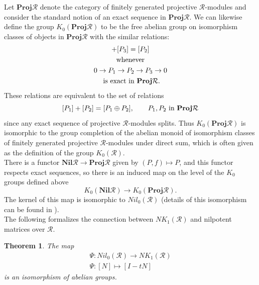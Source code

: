 \documentclass{amsart}
\newtheorem{thm}[equation]{Theorem}
\theoremstyle{definition}
\theoremstyle{definition}
\newcommand{\apr}{(Ap. \ref}
\newcommand{\calR}{\mathcal{R}}
\numberwithin{equation}{subsection}
\begin{document}
Let $\textbf{Proj}\calR$ denote the category of finitely generated projective $\calR$-modules and consider the standard notion of an exact sequence in $\textbf{Proj}\calR$. We can likewise define the group $K_{0}(\textbf{Proj}\calR)$ to be the free abelian group on isomorphism classes of objects in $\textbf{Proj}\calR$ with the similar relations:
\begin{gather*}
[P_{1}] + [P_{3}] = [P_{2}] \\
\textnormal{ whenever } \\
0 \to P_{1} \to P_{2} \to P_{3} \to 0 \\
\textnormal{ is exact in } \textbf{Proj}\calR.
\end{gather*}
These relations are equivalent to the set of relations
$$[P_{1}] + [P_{2}] = [P_{1} \oplus P_{2}], \qquad P_{1},P_{2} \textnormal{ in } \textbf{Proj}\calR$$
since any exact sequence of projective $\calR$-modules splits. Thus $K_{0}(\textbf{Proj}\calR)$ is isomorphic to the group completion of the abelian monoid of isomorphism classes of finitely generated projective $\calR$-modules under direct sum, which is often given as the definition of the group $K_{0}(\calR)$.\\

There is a functor $\textbf{Nil}\calR \to \textbf{Proj}\calR$ given by $(P,f) \mapsto P$, and this functor respects exact sequences, so there is an induced map on the level of the $K_{0}$ groups defined above
$$K_{0}(\textbf{Nil}\calR) \to K_{0}(\textbf{Proj}\calR).$$
The kernel of this map is isomorphic to $Nil_{0}(\calR)$ (details of this isomorphism can be found in \cite[Chapter II]{WeibelBook}).\\

The following formalizes the connection between $NK_{1}(\calR)$ and nilpotent matrices over $\calR$.
\begin{thm}\label{thm:nil0nk1iso}
The map
\begin{equation}\label{eqn:nil0nk1iso}
\begin{gathered}
\Psi \colon Nil_{0}(\calR) \to NK_{1}(\calR)\\
\Psi \colon [N] \mapsto [I-tN]
\end{gathered}
\end{equation}
is an isomorphism of abelian groups.
\end{thm}
\end{document}
